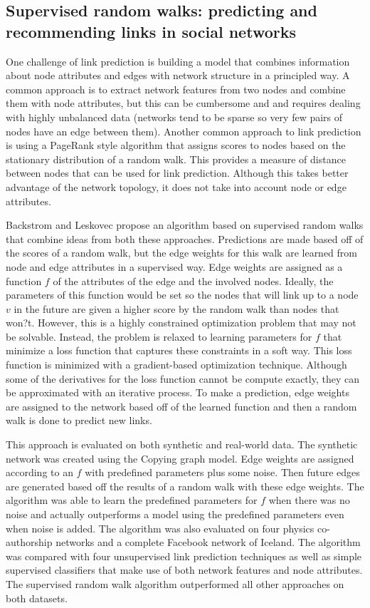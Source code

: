 \documentclass[11pt]{article}
\begin{document}
\subsection{Supervised random walks: predicting and recommending links in social networks \cite{backstromjure}}
One challenge of link prediction is building a model that combines information about node attributes and edges with network structure in a principled way. A common approach is to extract network features from two nodes and combine them with node attributes, but this can be cumbersome and and requires dealing with highly unbalanced data (networks tend to be sparse so very few pairs of nodes have an edge between them). Another common approach to link prediction is using a PageRank style algorithm that assigns scores to nodes based on the stationary distribution of a random walk. This provides a measure of distance between nodes that can be used for link prediction. Although this takes better advantage of the network topology, it does not take into account node or edge attributes. \\
\par
Backstrom and Leskovec propose an algorithm based on supervised random walks that combine ideas from both these approaches. Predictions are made based off of the scores of a random walk, but the edge weights for this walk are learned from node and edge attributes in a supervised way. Edge weights are assigned as a function $f$ of the attributes of the edge and the involved nodes. Ideally, the parameters of this function would be set so the nodes that will link up to a node $v$ in the future are given a higher score by the random walk than nodes that won?t. However, this is a highly constrained optimization problem that may not be solvable. Instead, the problem is relaxed to learning parameters for $f$ that minimize a loss function that captures these constraints in a soft way. This loss function is minimized with a gradient-based optimization technique. Although some of the derivatives for the loss function cannot be compute exactly, they can be approximated with an iterative process. To make a prediction, edge weights are assigned to the network based off of the learned function and then a random walk is done to predict new links. \\
\par
This approach is evaluated on both synthetic and real-world data. The synthetic network was created using the Copying graph model. Edge weights are assigned according to an $f$ with predefined parameters plus some noise. Then future edges are generated based off the results of a random walk with these edge weights. The algorithm was able to learn the predefined parameters for $f$ when there was no noise and actually outperforms a model using the predefined parameters even when noise is added. The algorithm was also evaluated on four physics co-authorship networks and a complete Facebook network of Iceland. The algorithm was compared with four unsupervised link prediction techniques as well as simple supervised classifiers that make use of both network features and node attributes. The supervised random walk algorithm outperformed all other approaches on both datasets. 
\end{document}
